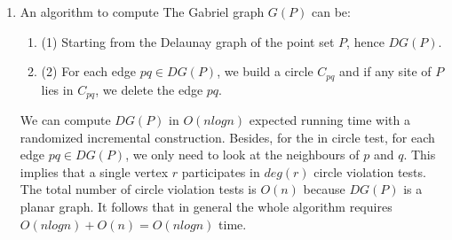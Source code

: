 \documentclass[12pt]{article}
\begin{document}
\begin{enumerate}[label=\alph*)]
	\item An algorithm to compute The Gabriel graph $G(P)$ can be:
	\begin{enumerate}[label=\roman*)]
		\item (1) Starting from the Delaunay graph of the point set $P$, hence $DG(P)$.
		\item (2) For each edge $pq \in DG(P)$, we build a circle $C_{pq}$ and if any site of $P$ lies in $C_{pq}$, we delete the edge $pq$.
	\end{enumerate}
	
	\noindent We can compute $DG(P)$ in $O(n log n)$ expected running time with a randomized incremental construction. Besides, for the in circle test, for each edge $pq \in DG(P)$, we only need to look at the neighbours of $p$ and $q$. This implies that a single vertex $r$ participates in $deg(r)$ circle violation tests. The total number of circle violation tests is $O(n)$ because $DG(P)$ is a planar graph. It follows that in general the whole algorithm requires $O(n log n) + O(n) = O(n log n)$ time.
\end{enumerate}
\end{document}
